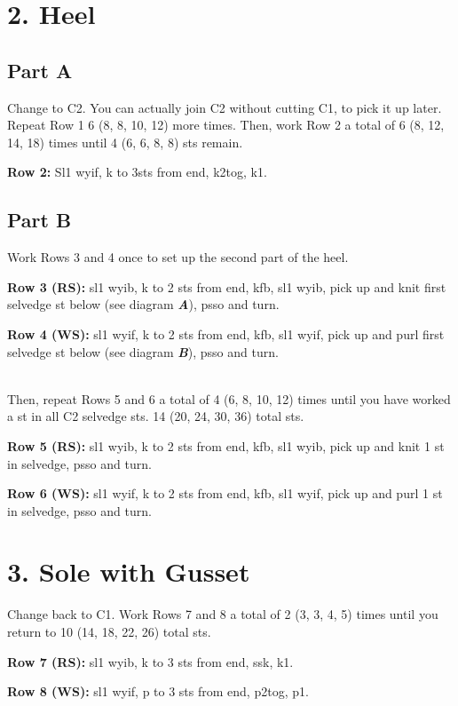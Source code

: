 \documentclass[12pt]{article}
\newcommand{\vocab}[1]{\emph{\textbf{#1}}} %
\newcommand{\rowDir}[1]{\textbf{#1:}} %
\begin{document}
\section*{2. Heel}

\subsection*{Part A}

Change to C2. You can actually join C2 without cutting C1, to pick it up later. Repeat Row 1 6 (8, 8, 10, 12) more times. Then, work Row 2 a total of 6 (8, 12, 14, 18) times until 4 (6, 6, 8, 8) sts remain.

\rowDir{Row 2} Sl1 wyif, k to 3sts from end, k2tog, k1.

\subsection*{Part B}

Work Rows 3 and 4 once to set up the second part of the heel.

\rowDir{Row 3 (RS)}  sl1 wyib, k to 2 sts from end, kfb, sl1 wyib, pick up and knit first selvedge st below (see diagram \vocab{A}), psso and turn.

\rowDir{Row 4 (WS)} sl1 wyif, k to 2 sts from end, kfb, sl1 wyif, pick up and purl first selvedge st below (see diagram \vocab{B}), psso and turn.

~\\
Then, repeat Rows 5 and 6 a total of 4 (6, 8, 10, 12) times until you have worked a st in all C2 selvedge sts. 14 (20, 24, 30, 36) total sts.

\rowDir{Row 5 (RS)} sl1 wyib, k to 2 sts from end, kfb, sl1 wyib, pick up and knit 1 st in selvedge, psso and turn.

\rowDir{Row 6 (WS)} sl1 wyif, k to 2 sts from end, kfb, sl1 wyif, pick up and purl 1 st in selvedge, psso and turn.

\section*{3. Sole with Gusset}

Change back to C1. Work Rows 7 and 8 a total of 2 (3, 3, 4, 5) times until you return to 10 (14, 18, 22, 26) %
total sts.

\rowDir{Row 7 (RS)} sl1 wyib, k to 3 sts from end, ssk, k1.

\rowDir{Row 8 (WS)}  sl1 wyif, p to 3 sts from end, p2tog, p1. 
\end{document}
